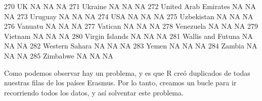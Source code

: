 \documentclass [a4paper] {article}
\begin{document}
\begin{Schunk}
\begin{Soutput}
270                                  UK    NA    NA   NA
271                             Ukraine    NA    NA   NA
272                United Arab Emirates    NA    NA   NA
273                             Uruguay    NA    NA   NA
274                                 USA    NA    NA   NA
275                          Uzbekistan    NA    NA   NA
276                             Vanuatu    NA    NA   NA
277                             Vatican    NA    NA   NA
278                           Venezuela    NA    NA   NA
279                             Vietnam    NA    NA   NA
280                      Virgin Islands    NA    NA   NA
281                   Wallis and Futuna    NA    NA   NA
282                      Western Sahara    NA    NA   NA
283                               Yemen    NA    NA   NA
284                              Zambia    NA    NA   NA
285                            Zimbabwe    NA    NA   NA
\end{Soutput}
\end{Schunk}

Como podemos observar hay un problema, y es que R creó duplicados de todas nuestras filas de los
países Erasmus. Por lo tanto, creamos un bucle para ir recorriendo todos los datos, y así 
solventar este problema.
\end{document}
